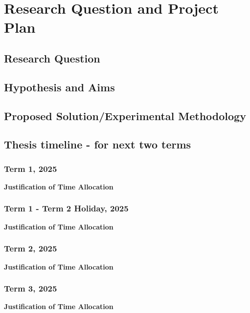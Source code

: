 \section{Research Question and Project Plan}


\subsection{Research Question}
\subsection{Hypothesis and Aims}
\subsection{Proposed Solution/Experimental Methodology}
\pagebreak

\subsection{Thesis timeline - for next two terms}
\subsubsection{Term 1, 2025}
\noindent \textbf{Justification of Time Allocation}
\subsubsection{Term 1 - Term 2 Holiday, 2025}
\noindent \textbf{Justification of Time Allocation}
\subsubsection{Term 2, 2025}
\noindent \textbf{Justification of Time Allocation}
\subsubsection{Term 3, 2025}
\noindent \textbf{Justification of Time Allocation}
\pagebreak

